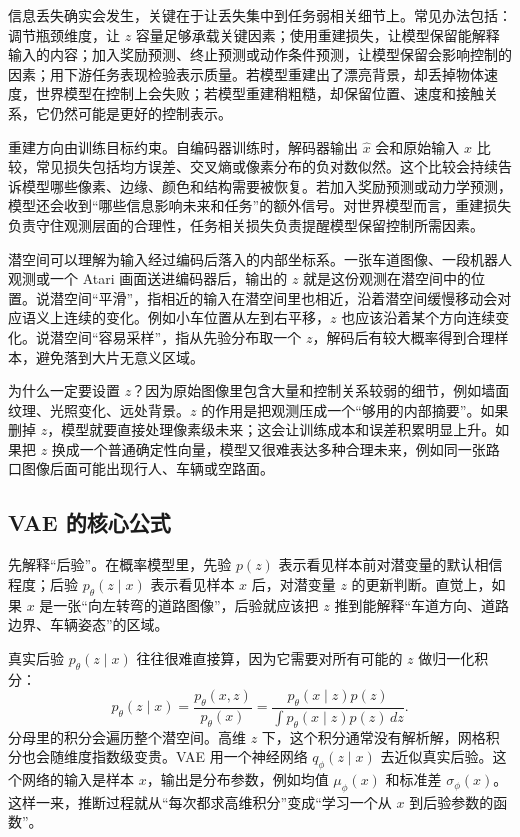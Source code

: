 \documentclass[11pt,a4paper]{ctexart}
\begin{document}
信息丢失确实会发生，关键在于让丢失集中到任务弱相关细节上。常见办法包括：调节瓶颈维度，让 $z$ 容量足够承载关键因素；使用重建损失，让模型保留能解释输入的内容；加入奖励预测、终止预测或动作条件预测，让模型保留会影响控制的因素；用下游任务表现检验表示质量。若模型重建出了漂亮背景，却丢掉物体速度，世界模型在控制上会失败；若模型重建稍粗糙，却保留位置、速度和接触关系，它仍然可能是更好的控制表示。

重建方向由训练目标约束。自编码器训练时，解码器输出 $\hat x$ 会和原始输入 $x$ 比较，常见损失包括均方误差、交叉熵或像素分布的负对数似然。这个比较会持续告诉模型哪些像素、边缘、颜色和结构需要被恢复。若加入奖励预测或动力学预测，模型还会收到“哪些信息影响未来和任务”的额外信号。对世界模型而言，重建损失负责守住观测层面的合理性，任务相关损失负责提醒模型保留控制所需因素。

潜空间可以理解为输入经过编码后落入的内部坐标系。一张车道图像、一段机器人观测或一个 Atari 画面送进编码器后，输出的 $z$ 就是这份观测在潜空间中的位置。说潜空间“平滑”，指相近的输入在潜空间里也相近，沿着潜空间缓慢移动会对应语义上连续的变化。例如小车位置从左到右平移，$z$ 也应该沿着某个方向连续变化。说潜空间“容易采样”，指从先验分布取一个 $z$，解码后有较大概率得到合理样本，避免落到大片无意义区域。

为什么一定要设置 $z$？因为原始图像里包含大量和控制关系较弱的细节，例如墙面纹理、光照变化、远处背景。$z$ 的作用是把观测压成一个“够用的内部摘要”。如果删掉 $z$，模型就要直接处理像素级未来；这会让训练成本和误差积累明显上升。如果把 $z$ 换成一个普通确定性向量，模型又很难表达多种合理未来，例如同一张路口图像后面可能出现行人、车辆或空路面。

\subsection{VAE 的核心公式}

先解释“后验”。在概率模型里，先验 $p(z)$ 表示看见样本前对潜变量的默认相信程度；后验 $p_\theta(z\mid x)$ 表示看见样本 $x$ 后，对潜变量 $z$ 的更新判断。直觉上，如果 $x$ 是一张“向左转弯的道路图像”，后验就应该把 $z$ 推到能解释“车道方向、道路边界、车辆姿态”的区域。

真实后验 $p_\theta(z\mid x)$ 往往很难直接算，因为它需要对所有可能的 $z$ 做归一化积分：
\begin{equation}
  p_\theta(z\mid x)
  =
  \frac{p_\theta(x,z)}{p_\theta(x)}
  =
  \frac{p_\theta(x\mid z)p(z)}
  {\int p_\theta(x\mid z)p(z)\,dz}.
\end{equation}
分母里的积分会遍历整个潜空间。高维 $z$ 下，这个积分通常没有解析解，网格积分也会随维度指数级变贵。VAE 用一个神经网络 $q_\phi(z\mid x)$ 去近似真实后验。这个网络的输入是样本 $x$，输出是分布参数，例如均值 $\mu_\phi(x)$ 和标准差 $\sigma_\phi(x)$。这样一来，推断过程就从“每次都求高维积分”变成“学习一个从 $x$ 到后验参数的函数”。
\end{document}

